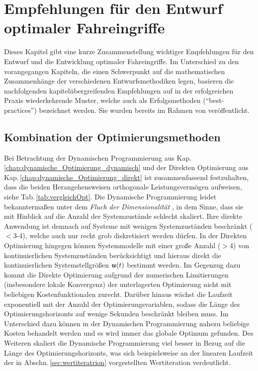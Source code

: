 \chapter{Empfehlungen für den Entwurf optimaler Fahreingriffe}

Dieses Kapitel gibt eine kurze Zusammenstellung wichtiger Empfehlungen für den Entwurf und die Entwicklung optimaler Fahreingriffe. Im Unterschied zu den vorangegangen Kapiteln, die einen Schwerpunkt auf die mathematischen Zusammenhänge der verschiedenen Entwurfsmethodiken legen, basieren die nachfolgenden kapitelübergreifenden Empfehlungen auf in der erfolgreichen Praxis wiederkehrende Muster, welche auch als Erfolgsmethoden ("`best-practices"') bezeichnet werden. Sie wurden bereits im Rahmen von  veröffentlicht.


\section{Kombination der Optimierungsmethoden}
Bei Betrachtung der Dynamischen Programmierung aus Kap.\,\ref{chap:dynamische_Optimierung_dynamisch} und der Direkten Optimierung aus Kap.\,\ref{chap:dynamische_Optimierung_direkt} ist zusammenfassend festzuhalten, dass die beiden Herangehensweisen orthogonale Leistungsvermögen aufweisen, siehe Tab.\,\ref{tab:vergleichOpt}. Die Dynamische Programmierung leidet bekanntermaßen unter dem \emph{Fluch der Dimensionalität} \cite{bellmann_DP,foellingeroptimal}, in dem Sinne, dass sie mit Hinblick auf die Anzahl der Systemzustände schlecht skaliert. Ihre direkte Anwendung ist demnach auf Systeme mit wenigen Systemzuständen beschränkt ($<$3-4), welche auch nur recht grob diskretisiert werden dürfen. In der Direkten Optimierung hingegen können Systemmodelle mit einer große Anzahl ($>$4) von kontinuierlichen Systemzuständen berücksichtigt und hieraus direkt die kontinuierlichen Systemstellgrößen  $\boldsymbol{u}(t)$ bestimmt werden. Im Gegenzug dazu kommt die Direkte Optimierung aufgrund der numerischen Limitierungen (insbesondere lokale Konvergenz) der unterlagerten Optimierung nicht mit beliebigen Kostenfunktionalen zurecht. Darüber hinaus wächst die Laufzeit exponentiell mit der Anzahl der Optimierungsvariablen, sodass die Länge des Optimierungshorizonts auf wenige Sekunden beschränkt bleiben muss. Im Unterschied dazu können in der Dynamischen Programmierung nahezu beliebige Kosten behandelt werden und es wird immer das globale Optimum gefunden. Des Weiteren skaliert die Dynamische Programmierung viel besser in Bezug auf die Länge des Optimierungshorizonts, was sich beispielsweise an der linearen Laufzeit der in Abschn.\,\ref{sec:wertiteratrion} vorgestellten Wertiteration verdeutlicht. 


